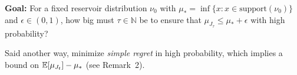 \begin{figure}
\centering
{}
\vspace{-.25in}
\end{figure}


\noindent\textbf{Goal:} For a fixed reservoir distribution $\nu_0$ with $\mu_* = \inf \{ x : x \in \text{support}(\nu_0) \}$ and $\epsilon \in (0,1)$, how big must $\tau \in \mathbb{N}$ be to ensure that $\mu_{J_\tau} \leq \mu_* + \epsilon$ with high probability?

\noindent Said another way, minimize \emph{simple regret} \citep{bubeck2009pure,DBLP:journals/corr/CarpentierV15} in high probability, which implies a bound on $\mathbb{E}[\mu_{J_t}]-\mu_*$ (see Remark~2).


